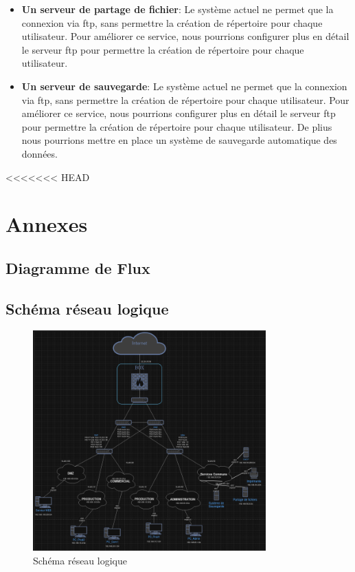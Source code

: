 \documentclass[a4paper,12pt,openany]{report}
\begin{document}
            \begin{itemize}
                \item \textbf{Un serveur de partage de fichier}: Le système actuel ne permet que la connexion via ftp, sans permettre la création de répertoire pour chaque utilisateur. Pour améliorer ce service, nous pourrions configurer plus en détail le serveur ftp pour permettre la création de répertoire pour chaque utilisateur.
                \item \textbf{Un serveur de sauvegarde}: Le système actuel ne permet que la connexion via ftp, sans permettre la création de répertoire pour chaque utilisateur. Pour améliorer ce service, nous pourrions configurer plus en détail le serveur ftp pour permettre la création de répertoire pour chaque utilisateur. De plius nous pourrions mettre en place un système de sauvegarde automatique des données.
            \end{itemize} 
<<<<<<< HEAD
    \chapter*{Annexes}
        \section{Diagramme de Flux}
        \section{Schéma réseau logique}
            \begin{figure}
                \centering
                \includegraphics[width=0.8\textwidth]{Images/Schema_logique.png}
                \caption{Schéma réseau logique}
            \end{figure}
\end{document}
